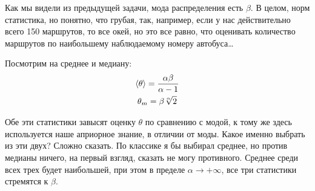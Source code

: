 \begin{solution}
    Как мы видели из предыдущей задачи, мода распределения есть $\beta$. В целом, норм статистика, но понятно, что грубая, так, например, если у нас действительно всего 150 маршрутов, то все окей, но это все равно, что оценивать количество маршрутов по наибольшему наблюдаемому номеру автобуса\ldots

    Посмотрим на среднее и медиану:
    \begin{gather}
        \braket{\theta} = \frac{\alpha \beta}{\alpha - 1} \\
        \theta_m = \beta \sqrt[\alpha]{2}
    \end{gather}

    Обе эти статистики завысят оценку $\theta$ по сравнению с модой, к тому же здесь используется наше априорное знание, в отличии от моды. Какое именно выбрать из эти двух? Сложно сказать. По классике я бы выбирал среднее, но против медианы ничего, на первый взгляд, сказать не могу противного. Среднее среди всех трех будет наибольшей, при этом в пределе $\alpha \to +\infty$, все три статистики стремятся к $\beta$.

\end{solution}

